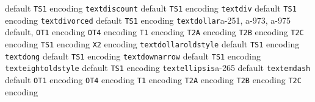 \documentclass[twoside]{ltxdoc}
\makeatletter
\renewenvironment{theindex}{%
   \@restonecoltrue
   \if@twocolumn\@restonecolfalse\fi
   \columnseprule \z@
   \columnsep 35\p@
   \twocolumn[\index@prologue]%
   \IndexParms
   \let\item\@idxitem
   \ignorespaces
}{\if@restonecol\onecolumn\else\clearpage\fi}
\makeatother
\begin{document}
\begin{theindex}
    \subitem default\pfill {}
    \subitem \texttt  {TS1} encoding\pfill {}
  \item \texttt  {textdiscount}\efill 
    \subitem default\pfill {}
    \subitem \texttt  {TS1} encoding\pfill {}
  \item \texttt  {textdiv}\efill 
    \subitem default\pfill {}
    \subitem \texttt  {TS1} encoding\pfill {}
  \item \texttt  {textdivorced}\efill 
    \subitem default\pfill {}
    \subitem \texttt  {TS1} encoding\pfill {}
  \item \texttt  {textdollar}\pfill a-251, a-973, a-975
    \subitem default\pfill {}, 
    \subitem \texttt  {OT1} encoding\pfill {}
    \subitem \texttt  {OT4} encoding\pfill {}
    \subitem \texttt  {T1} encoding\pfill {}
    \subitem \texttt  {T2A} encoding\pfill {}
    \subitem \texttt  {T2B} encoding\pfill {}
    \subitem \texttt  {T2C} encoding\pfill {}
    \subitem \texttt  {TS1} encoding\pfill {}
    \subitem \texttt  {X2} encoding\pfill {}
  \item \texttt  {textdollaroldstyle}\efill 
    \subitem default\pfill {}
    \subitem \texttt  {TS1} encoding\pfill {}
  \item \texttt  {textdong}\efill 
    \subitem default\pfill {}
    \subitem \texttt  {TS1} encoding\pfill {}
  \item \texttt  {textdownarrow}\efill 
    \subitem default\pfill {}
    \subitem \texttt  {TS1} encoding\pfill {}
  \item \texttt  {texteightoldstyle}\efill 
    \subitem default\pfill {}
    \subitem \texttt  {TS1} encoding\pfill {}
  \item \texttt  {textellipsis}\pfill a-265
    \subitem default\pfill {}
  \item \texttt  {textemdash}\efill 
    \subitem default\pfill {}
    \subitem \texttt  {OT1} encoding\pfill {}
    \subitem \texttt  {OT4} encoding\pfill {}
    \subitem \texttt  {T1} encoding\pfill {}
    \subitem \texttt  {T2A} encoding\pfill {}
    \subitem \texttt  {T2B} encoding\pfill {}
    \subitem \texttt  {T2C} encoding\pfill {}

\end{theindex}
\end{document}
